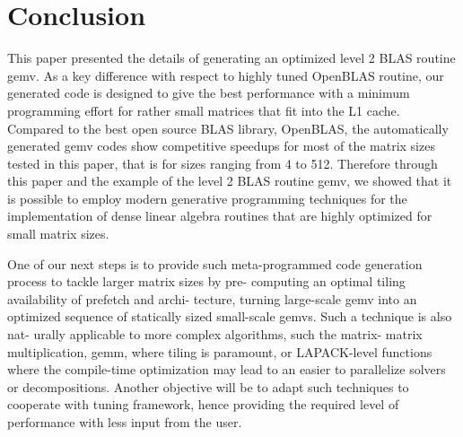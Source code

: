 \documentclass[../../main.tex]{subfiles}
\begin{document}
\section{Conclusion}

This paper presented the details of generating an optimized
level 2 BLAS routine gemv. As a key difference with respect
to highly tuned OpenBLAS routine, our generated code
is designed to give the best performance with a minimum
programming effort for rather small matrices that fit into the
L1 cache. Compared to the best open source BLAS library,
OpenBLAS, the automatically generated gemv codes show
competitive speedups for most of the matrix sizes tested in
this paper, that is for sizes ranging from 4 to 512. Therefore
through this paper and the example of the level 2 BLAS
routine gemv, we showed that it is possible to employ modern
generative programming techniques for the implementation
of dense linear algebra routines that are highly optimized for
small matrix sizes.

One of our next steps is to provide such meta-programmed
code generation process to tackle larger matrix sizes by pre-
computing an optimal tiling availability of prefetch and archi-
tecture, turning large-scale gemv into an optimized sequence of
statically sized small-scale gemvs. Such a technique is also nat-
urally applicable to more complex algorithms, such the matrix-
matrix multiplication, gemm, where tiling is paramount, or
LAPACK-level functions where the compile-time optimization
may lead to an easier to parallelize solvers or decompositions.
Another objective will be to adapt such techniques to cooperate
with tuning framework, hence providing the required level of
performance with less input from the user.
\end{document}
